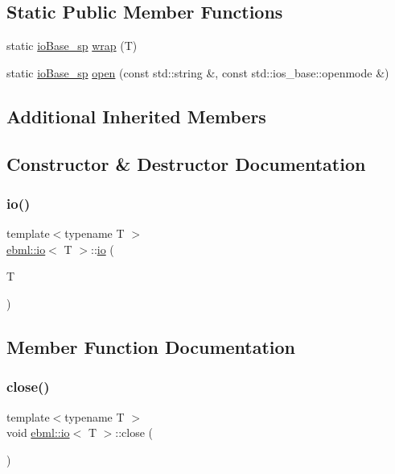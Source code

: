 \subsection*{Static Public Member Functions}
\begin{DoxyCompactItemize}
\item 
static \mbox{\hyperlink{namespaceebml_a7bb59128ac6af27e47367938a846b569}{io\+Base\+\_\+sp}} \mbox{\hyperlink{classebml_1_1io_a722fbb02777e4af8e42779750c588f63}{wrap}} (T)
\item 
static \mbox{\hyperlink{namespaceebml_a7bb59128ac6af27e47367938a846b569}{io\+Base\+\_\+sp}} \mbox{\hyperlink{classebml_1_1io_a98871b6a6ceafc80df00f95867b7cbe4}{open}} (const std\+::string \&, const std\+::ios\+\_\+base\+::openmode \&)
\end{DoxyCompactItemize}
\subsection*{Additional Inherited Members}


\subsection{Constructor \& Destructor Documentation}
\mbox{\label{classebml_1_1io_acf15f9f08eb2e65c72363320aa8bc112}} 
\subsubsection{\texorpdfstring{io()}{io()}}
{\footnotesize\ttfamily template$<$typename T $>$ \\
\mbox{\hyperlink{classebml_1_1io}{ebml\+::io}}$<$ T $>$\+::\mbox{\hyperlink{classebml_1_1io}{io}} (\begin{DoxyParamCaption}\item[{T}]{ }\end{DoxyParamCaption})}



\subsection{Member Function Documentation}
\mbox{\label{classebml_1_1io_a929714d05587d37d46bf8813b35c788d}} 
\subsubsection{\texorpdfstring{close()}{close()}}
{\footnotesize\ttfamily template$<$typename T $>$ \\
void \mbox{\hyperlink{classebml_1_1io}{ebml\+::io}}$<$ T $>$\+::close (\begin{DoxyParamCaption}{ }\end{DoxyParamCaption})}


